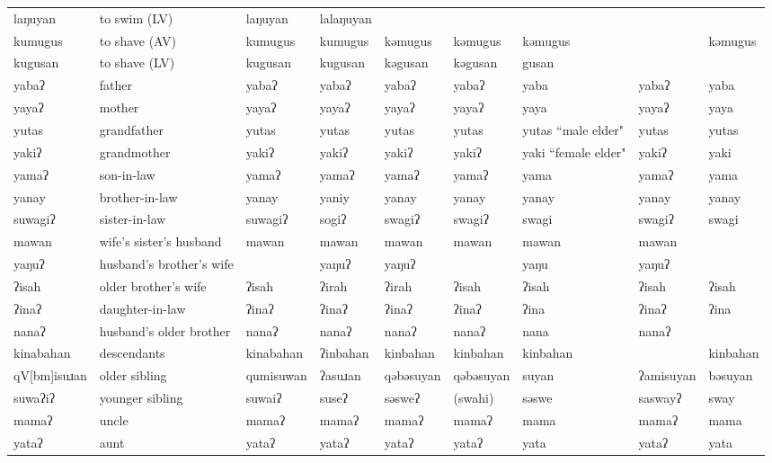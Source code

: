 \begin{landscape}
\begin{longtable}{*{9}{>{\raggedright\arraybackslash}p{}}}
\text{*}laŋuyan & to swim (LV) & laŋuyan & lalaŋuyan &  &  &  &  & \\
\text{*}kumugus & to shave (AV) & kumugus & kumugus & kəmugus & kəmugus & kəmugus &  & kəmugus\\
\text{*}kugusan & to shave (LV) & kugusan & kugusan & kəgusan & kəgusan & gusan &  & \\
\text{*}yabaʔ & father & yabaʔ & yabaʔ & yabaʔ & yabaʔ & yaba & yabaʔ & yaba\\
\text{*}yayaʔ & mother & yayaʔ & yayaʔ & yayaʔ & yayaʔ & yaya & yayaʔ & yaya\\
\text{*}yutas & grandfather & yutas & yutas & yutas & yutas & yutas ``male elder" & yutas & yutas\\
\text{*}yakiʔ & grandmother & yakiʔ & yakiʔ & yakiʔ & yakiʔ & yaki ``female elder" & yakiʔ & yaki\\
\text{*}yamaʔ & son-in-law & yamaʔ & yamaʔ & yamaʔ & yamaʔ & yama & yamaʔ & yama\\
\text{*}yanay & brother-in-law & yanay & yaniy & yanay & yanay & yanay & yanay & yanay\\
\text{*}suwagiʔ & sister-in-law & suwagiʔ & sogiʔ & swagiʔ & swagiʔ & swagi & swagiʔ & swagi\\
\text{*}mawan & wife's sister's husband & mawan & mawan & mawan & mawan & mawan & mawan & \\
\text{*}yaŋuʔ & husband's brother's wife &  & yaŋuʔ & yaŋuʔ &  & yaŋu & yaŋuʔ & \\
\text{*}ʔisah & older brother's wife & ʔisah & ʔirah & ʔirah & ʔisah & ʔisah & ʔisah & ʔisah\\
\text{*}ʔinaʔ & daughter-in-law & ʔinaʔ & ʔinaʔ & ʔinaʔ & ʔinaʔ & ʔina & ʔinaʔ & ʔina\\
\text{*}nanaʔ & husband's older brother & nanaʔ & nanaʔ & nanaʔ & nanaʔ & nana & nanaʔ & \\
\text{*}kinabahan & descendants & kinabahan & ʔinbahan & kinbahan & kinbahan & kinbahan &  & kinbahan\\
\text{*}qV[bm]isuɹan & older sibling & qumisuwan & ʔasuɹan & qəbəsuyan & qəbəsuyan & suyan & ʔamisuyan & bəsuyan\\
\text{*}suwaʔiʔ & younger sibling & suwaiʔ & suseʔ & səsweʔ & (swahi) & səswe & saswayʔ & sway\\
\text{*}mamaʔ & uncle & mamaʔ & mamaʔ & mamaʔ & mamaʔ & mama & mamaʔ & mama\\
\text{*}yataʔ & aunt & yataʔ & yataʔ & yataʔ & yataʔ & yata & yataʔ & yata\\

\end{longtable}
\end{landscape}
